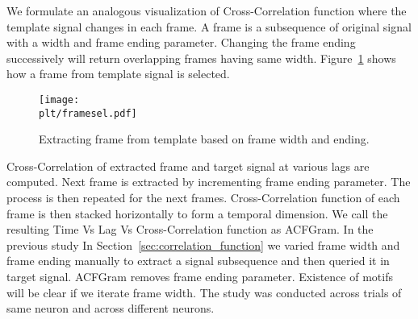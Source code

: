 \documentclass[MTech]{iitmdiss}
\newcommand{\plt}{thesis_plots}
\begin{document}
We formulate an analogous visualization of Cross-Correlation function where the template signal changes in each frame. A frame is a subsequence of original signal with a width and frame ending parameter. Changing the frame ending successively will return overlapping frames having same width. Figure~\ref{img:framesel} shows how a frame from template signal is selected.
\begin{figure}[h]
    \centering
    \texttt{[image: \\plt/framesel.pdf]}
    \caption{Extracting frame from template based on frame width and ending.}
    \label{img:framesel}
\end{figure}
Cross-Correlation of extracted frame and target signal at various lags are computed. Next frame is extracted by incrementing frame ending parameter. The process is then repeated for the next frames. Cross-Correlation function of each frame is then stacked horizontally to form a temporal dimension. We call the resulting Time Vs Lag Vs Cross-Correlation function as ACFGram.
In the previous study
In Section~\ref{sec:correlation_function} we varied frame width and frame ending manually to extract a signal subsequence and then queried it in target signal. ACFGram removes frame ending parameter. Existence of motifs will be clear if we iterate frame width. The study was conducted across trials of same neuron and across different neurons.
\end{document}
